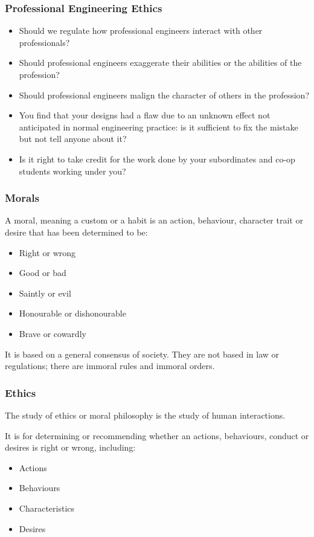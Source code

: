 \begin{frame}
\frametitle{Professional Engineering Ethics}

\begin{itemize}
	\item Should we regulate how professional engineers interact with other professionals?
	\item Should professional engineers exaggerate their abilities or the abilities of the profession?
	\item Should professional engineers malign the character of others in the profession?
	\item You find that your designs had a flaw due to an unknown effect not anticipated in normal engineering practice:  is it sufficient to fix the mistake but not tell anyone about it?
	\item Is it right to take credit for the work done by your subordinates and co-op students working under you?
\end{itemize}

\end{frame}



\begin{frame}
\frametitle{Morals}

A moral, meaning a custom or a habit is an action, behaviour, character trait or desire that has been determined to be:

\begin{itemize}
	\item Right or wrong
	\item Good or bad
	\item Saintly or evil
	\item Honourable or dishonourable
	\item Brave or cowardly
\end{itemize}

It is based on a general consensus of society. They are not based in law or regulations;
there are immoral rules and immoral orders.


\end{frame}



\begin{frame}
\frametitle{Ethics}

The study of ethics or moral philosophy is the study of human interactions.

It is for determining or recommending whether an actions, behaviours, conduct or desires is right or wrong, including:

\begin{itemize}
	\item Actions
	\item Behaviours
	\item Characteristics
	\item Desires
\end{itemize}


\end{frame}



